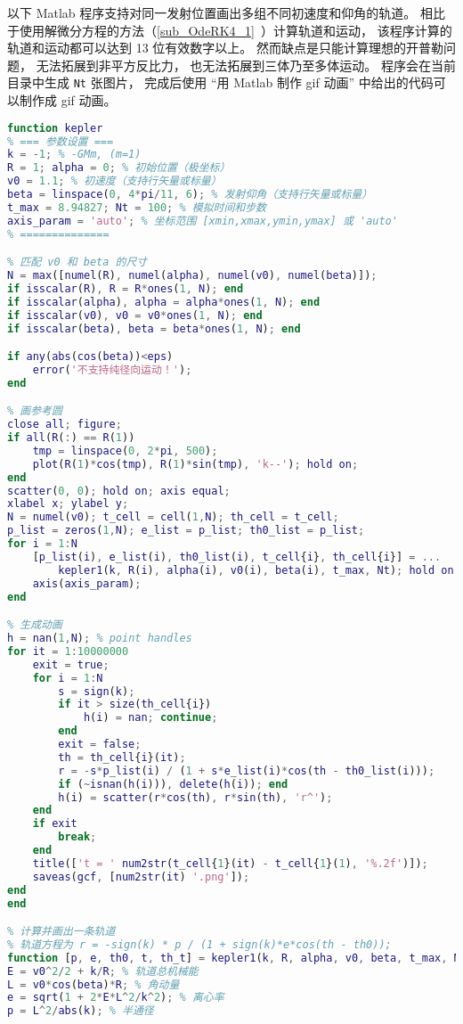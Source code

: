 以下 Matlab 程序支持对同一发射位置画出多组不同初速度和仰角的轨道。 相比于使用解微分方程的方法（\autoref{sub_OdeRK4_1}~）计算轨道和运动， 该程序计算的轨道和运动都可以达到 13 位有效数字以上。 然而缺点是只能计算理想的开普勒问题， 无法拓展到非平方反比力， 也无法拓展到三体乃至多体运动。 程序会在当前目录中生成 \verb|Nt| 张图片， 完成后使用 “用 Matlab 制作 gif 动画” 中给出的代码可以制作成 gif 动画。

\begin{lstlisting}[language=matlab,caption=kepler.m]
% 已知初始位置、发射速度、发射方向， 求轨道以及运动方程
function kepler
% === 参数设置 ===
k = -1; % -GMm, (m=1)
R = 1; alpha = 0; % 初始位置（极坐标）
v0 = 1.1; % 初速度（支持行矢量或标量）
beta = linspace(0, 4*pi/11, 6); % 发射仰角（支持行矢量或标量）
t_max = 8.94827; Nt = 100; % 模拟时间和步数
axis_param = 'auto'; % 坐标范围 [xmin,xmax,ymin,ymax] 或 'auto'
% ==============

% 匹配 v0 和 beta 的尺寸
N = max([numel(R), numel(alpha), numel(v0), numel(beta)]);
if isscalar(R), R = R*ones(1, N); end
if isscalar(alpha), alpha = alpha*ones(1, N); end
if isscalar(v0), v0 = v0*ones(1, N); end
if isscalar(beta), beta = beta*ones(1, N); end

if any(abs(cos(beta))<eps)
    error('不支持纯径向运动！');
end

% 画参考圆
close all; figure;
if all(R(:) == R(1))
    tmp = linspace(0, 2*pi, 500);
    plot(R(1)*cos(tmp), R(1)*sin(tmp), 'k--'); hold on;
end
scatter(0, 0); hold on; axis equal;
xlabel x; ylabel y;
N = numel(v0); t_cell = cell(1,N); th_cell = t_cell;
p_list = zeros(1,N); e_list = p_list; th0_list = p_list;
for i = 1:N
    [p_list(i), e_list(i), th0_list(i), t_cell{i}, th_cell{i}] = ...
        kepler1(k, R(i), alpha(i), v0(i), beta(i), t_max, Nt); hold on;
    axis(axis_param);
end

% 生成动画
h = nan(1,N); % point handles
for it = 1:10000000
    exit = true;
    for i = 1:N
        s = sign(k);
        if it > size(th_cell{i})
            h(i) = nan; continue;
        end
        exit = false;
        th = th_cell{i}(it);
        r = -s*p_list(i) / (1 + s*e_list(i)*cos(th - th0_list(i)));
        if (~isnan(h(i))), delete(h(i)); end
        h(i) = scatter(r*cos(th), r*sin(th), 'r^');
    end
    if exit
        break;
    end
    title(['t = ' num2str(t_cell{1}(it) - t_cell{1}(1), '%.2f')]);
    saveas(gcf, [num2str(it) '.png']);
end
end

% 计算并画出一条轨道
% 轨道方程为 r = -sign(k) * p / (1 + sign(k)*e*cos(th - th0));
function [p, e, th0, t, th_t] = kepler1(k, R, alpha, v0, beta, t_max, Nt)
E = v0^2/2 + k/R; % 轨道总机械能
L = v0*cos(beta)*R; % 角动量
e = sqrt(1 + 2*E*L^2/k^2); % 离心率
p = L^2/abs(k); % 半通径


\end{lstlisting}

